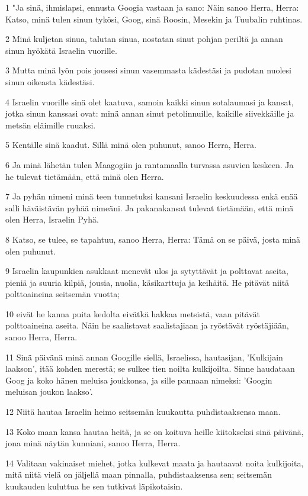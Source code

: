 \par 1 "Ja sinä, ihmislapsi, ennusta Googia vastaan ja sano: Näin sanoo Herra, Herra: Katso, minä tulen sinun tykösi, Goog, sinä Roosin, Mesekin ja Tuubalin ruhtinas.
\par 2 Minä kuljetan sinua, talutan sinua, nostatan sinut pohjan periltä ja annan sinun hyökätä Israelin vuorille.
\par 3 Mutta minä lyön pois jousesi sinun vasemmasta kädestäsi ja pudotan nuolesi sinun oikeasta kädestäsi.
\par 4 Israelin vuorille sinä olet kaatuva, samoin kaikki sinun sotalaumasi ja kansat, jotka sinun kanssasi ovat: minä annan sinut petolinnuille, kaikille siivekkäille ja metsän eläimille ruuaksi.
\par 5 Kentälle sinä kaadut. Sillä minä olen puhunut, sanoo Herra, Herra.
\par 6 Ja minä lähetän tulen Maagogiin ja rantamaalla turvassa asuvien keskeen. Ja he tulevat tietämään, että minä olen Herra.
\par 7 Ja pyhän nimeni minä teen tunnetuksi kansani Israelin keskuudessa enkä enää salli häväistävän pyhää nimeäni. Ja pakanakansat tulevat tietämään, että minä olen Herra, Israelin Pyhä.
\par 8 Katso, se tulee, se tapahtuu, sanoo Herra, Herra: Tämä on se päivä, josta minä olen puhunut.
\par 9 Israelin kaupunkien asukkaat menevät ulos ja sytyttävät ja polttavat aseita, pieniä ja suuria kilpiä, jousia, nuolia, käsikarttuja ja keihäitä. He pitävät niitä polttoaineina seitsemän vuotta;
\par 10 eivät he kanna puita kedolta eivätkä hakkaa metsistä, vaan pitävät polttoaineina aseita. Näin he saalistavat saalistajiaan ja ryöstävät ryöstäjiään, sanoo Herra, Herra.
\par 11 Sinä päivänä minä annan Googille siellä, Israelissa, hautasijan, 'Kulkijain laakson', itää kohden merestä; se sulkee tien noilta kulkijoilta. Sinne haudataan Goog ja koko hänen meluisa joukkonsa, ja sille pannaan nimeksi: 'Googin meluisan joukon laakso'.
\par 12 Niitä hautaa Israelin heimo seitsemän kuukautta puhdistaaksensa maan.
\par 13 Koko maan kansa hautaa heitä, ja se on koituva heille kiitokseksi sinä päivänä, jona minä näytän kunniani, sanoo Herra, Herra.
\par 14 Valitaan vakinaiset miehet, jotka kulkevat maata ja hautaavat noita kulkijoita, mitä niitä vielä on jäljellä maan pinnalla, puhdistaaksensa sen; seitsemän kuukauden kuluttua he sen tutkivat läpikotaisin.
